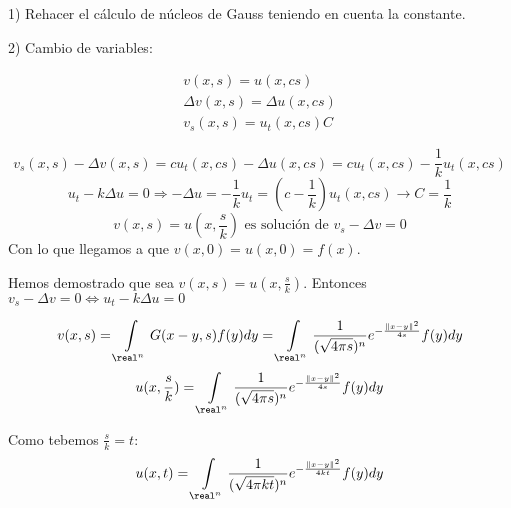 1) Rehacer el cálculo de núcleos de Gauss teniendo en cuenta la constante.

2) Cambio de variables:

\begin{gather*}
	v(x,s) = u(x,cs)\\
	\Delta v(x,s) = \Delta u(x,cs)\\
	v_s(x,s) = u_t (x,cs) C
\end{gather*}

\[ v_s (x,s) - \Delta v(x,s) = c u_t (x,cs) - \Delta u(x,cs) = c u_t (x, cs) - \frac{1}{k} u_t (x,cs) \]
\[ u_t - k \Delta u = 0 \Rightarrow - \Delta u = - \frac{1}{k} u_t = (c - \frac{1}{k}) u_t(x,cs) \to C = \frac{1}{k}\]
\[ v(x,s) = u(x,\frac{s}{k}) \text{ es solución de } v_s - \Delta v = 0\]
Con lo que llegamos a que $ v(x,0) = u(x,0) = f(x)$.

Hemos demostrado que sea $v(x,s) = u(x,\frac{s}{k})$. Entonces $v_s - \Delta v = 0 \Leftrightarrow u_t - k \Delta u = 0$

\[ v(x,s) = \int\limits_{\real^n} G(x-y,s) f(y) dy = \int\limits_{\real^n} \frac{1}{(\sqrt{4\pi s})^n} e^{-\frac{\|x-y\|^2}{4s}} f(y) dy \]
\[ u(x,\frac{s}{k}) = \int\limits_{\real^n} \frac{1}{(\sqrt{4\pi s})^n} e^{-\frac{\|x-y\|^2}{4s}} f(y) dy \]

Como tebemos $\frac{s}{k} = t$:
\[ u(x,t) = \int\limits_{\real^n} \frac{1}{(\sqrt{4\pi kt})^n} e^{-\frac{\|x-y\|^2}{4kt}} f(y) dy\]





